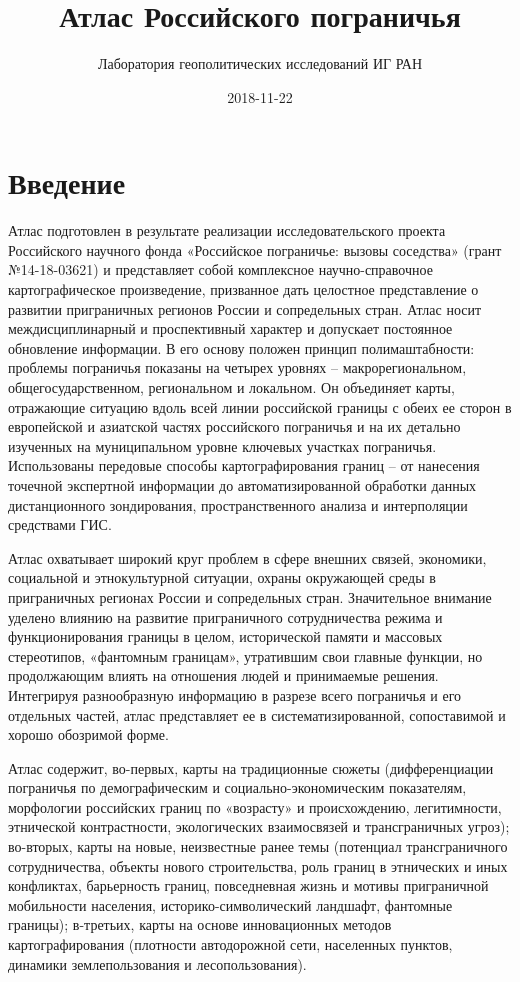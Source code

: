 \documentclass[]{book}
\title{Атлас Российского пограничья}
\author{Лаборатория геополитических исследований ИГ РАН}
\date{2018-11-22}
\begin{document}
\maketitle

{
\setcounter{tocdepth}{1}
\tableofcontents
}
\chapter*{Введение}

Атлас подготовлен в результате реализации исследовательского проекта
Российского научного фонда «Российское пограничье: вызовы соседства»
(грант №14-18-03621) и представляет собой комплексное научно-справочное
картографическое произведение, призванное дать целостное представление о
развитии приграничных регионов России и сопредельных стран. Атлас носит
междисциплинарный и проспективный характер и допускает постоянное
обновление информации. В его основу положен принцип полимаштабности:
проблемы пограничья показаны на четырех уровнях -- макрорегиональном,
общегосударственном, региональном и локальном. Он объединяет карты,
отражающие ситуацию вдоль всей линии российской границы с обеих ее
сторон в европейской и азиатской частях российского пограничья и на их
детально изученных на муниципальном уровне ключевых участках пограничья.
Использованы передовые способы картографирования границ -- от нанесения
точечной экспертной информации до автоматизированной обработки данных
дистанционного зондирования, пространственного анализа и интерполяции
средствами ГИС.

Атлас охватывает широкий круг проблем в сфере внешних связей, экономики,
социальной и этнокультурной ситуации, охраны окружающей среды в
приграничных регионах России и сопредельных стран. Значительное внимание
уделено влиянию на развитие приграничного сотрудничества режима и
функционирования границы в целом, исторической памяти и массовых
стереотипов, «фантомным границам», утратившим свои главные функции, но
продолжающим влиять на отношения людей и принимаемые решения. Интегрируя
разнообразную информацию в разрезе всего пограничья и его отдельных
частей, атлас представляет ее в систематизированной, сопоставимой и
хорошо обозримой форме.

Атлас содержит, во-первых, карты на традиционные сюжеты (дифференциации
пограничья по демографическим и социально-экономическим показателям,
морфологии российских границ по «возрасту» и происхождению,
легитимности, этнической контрастности, экологических взаимосвязей и
трансграничных угроз); во-вторых, карты на новые, неизвестные ранее темы
(потенциал трансграничного сотрудничества, объекты нового строительства,
роль границ в этнических и иных конфликтах, барьерность границ,
повседневная жизнь и мотивы приграничной мобильности населения,
историко-символический ландшафт, фантомные границы); в-третьих, карты на
основе инновационных методов картографирования (плотности автодорожной
сети, населенных пунктов, динамики землепользования и лесопользования).
\end{document}
